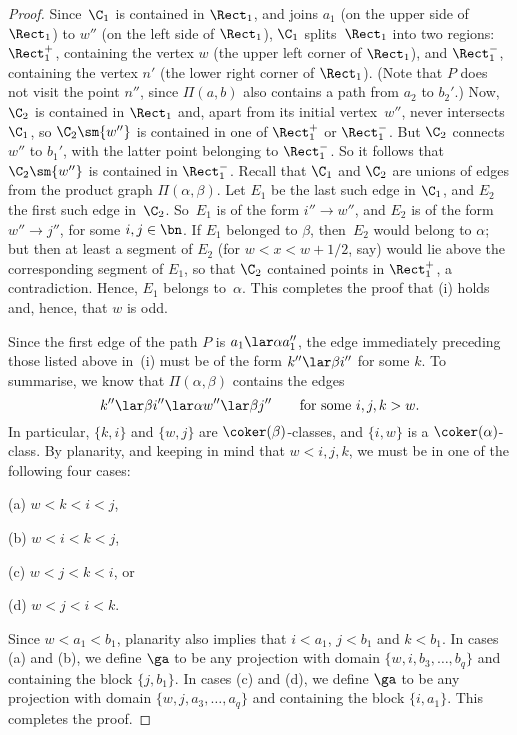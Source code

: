 \begin{proof}
Since~$\C_1$ is contained in $\Rect_1$, and joins $a_1$ (on the upper side of $\Rect_1$) to $w''$ (on the left side of $\Rect_1$), $\C_1$ splits~$\Rect_1$ into two regions: $\Rect_1^+$, containing the vertex $w$ (the upper left corner of $\Rect_1$), and $\Rect_1^-$, containing the vertex $n'$ (the lower right corner of $\Rect_1$).  (Note that $P$ does not visit the point $n''$, since $\Pi(a,b)$ also contains a path from $a_2$ to $b_2'$.)  Now, $\C_2$ is contained in $\Rect_1$ and, apart from its initial vertex~$w''$, never intersects~$\C_1$, so $\C_2\sm\{w''\}$ is contained in one of $\Rect_1^+$ or $\Rect_1^-$.  But $\C_2$ connects $w''$ to $b_1'$, with the latter point belonging to $\Rect_1^-$.  So it follows that $\C_2\sm\{w''\}$ is contained in $\Rect_1^-$.  
%
Recall that $\C_1$ and $\C_2$ are unions of edges from the product graph $\Pi(\alpha,\beta)$.  Let $E_1$ be the last such edge in $\C_1$, and $E_2$ the first such edge in~$\C_2$.  So~$E_1$ is of the form $i''\to w''$, and $E_2$ is of the form $w''\to j''$, for some $i,j\in\bn$.  If $E_1$ belonged to $\beta$, then~$E_2$ would belong to $\alpha$; but then at least a segment of $E_2$ (for $w<x<w+1/2$, say) would lie above the corresponding segment of $E_1$, so that $\C_2$ contained points in $\Rect_1^+$, a contradiction.  Hence, $E_1$ belongs to~$\alpha$.  This completes the proof that (i) holds and, hence, that $w$ is odd.

Since the first edge of the path $P$ is $a_1\lar\alpha a_1''$, the edge immediately preceding those listed above in~(i) must be of the form $k''\lar\beta i''$ for some $k$.  To summarise, we know that $\Pi(\alpha,\beta)$ contains the edges
\[
k''\lar\beta i''\lar\alpha w''\lar\beta j'' \qquad\text{for some $i,j,k>w$.}
\]
In particular, $\{k,i\}$ and $\{w,j\}$ are $\coker(\beta)$-classes, and $\{i,w\}$ is a $\coker(\alpha)$-class.  By planarity, and keeping in mind that $w<i,j,k$, we must be in one of the following four cases:
\begin{itemize}\begin{multicols}{4}
\item[(a)] $w<k<i<j$,
\item[(b)] $w<i<k<j$,
\item[(c)] $w<j<k<i$, or
\item[(d)] $w<j<i<k$.
\end{multicols}\end{itemize}
Since $w<a_1<b_1$, planarity also implies that $i<a_1$, $j<b_1$ and $k<b_1$.  In cases (a) and (b), we define $\ga$ to be any projection with domain $\{w,i,b_3,\ldots,b_q\}$ and containing the block $\{j,b_1\}$.  In cases (c) and (d), we define $\ga$ to be any projection with domain $\{w,j,a_3,\ldots,a_q\}$ and containing the block $\{i,a_1\}$.  This completes the proof. \end{proof}





